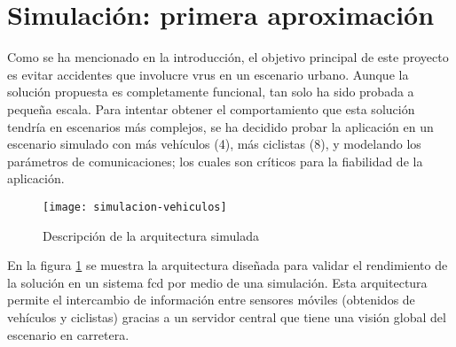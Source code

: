 \section{Simulación: primera aproximación}
Como se ha mencionado en la introducción, el objetivo principal de este proyecto es evitar accidentes que involucre \gls{vru}s en un escenario urbano. Aunque la solución propuesta es completamente funcional, tan solo ha sido probada a pequeña escala. Para intentar obtener el comportamiento que esta solución tendría en escenarios más complejos, se ha decidido probar la aplicación en un escenario simulado con más vehículos (4), más ciclistas (8), y modelando los parámetros de comunicaciones; los cuales son críticos para la fiabilidad de la aplicación.
\begin{figure}[t]
	\texttt{[image: simulacion-vehiculos]}
	\caption{Descripción de la arquitectura simulada}
	\label{fig:simulacion-vehiculos}
\end{figure}
En la figura \ref{fig:simulacion-vehiculos} se muestra la arquitectura diseñada para validar el rendimiento de la solución en un sistema \gls{fcd} por medio de una simulación. Esta arquitectura permite el intercambio de información entre sensores móviles (obtenidos de vehículos y ciclistas) gracias a un servidor central que tiene una visión global del escenario en carretera.


